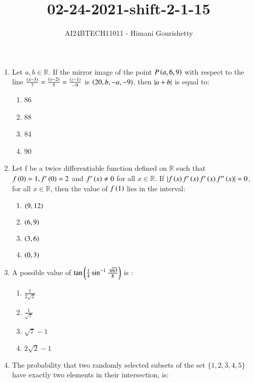\documentclass[journal,12pt,onecolumn]{IEEEtran}
\theoremstyle{remark}
\begin{document}

\vspace{3cm}

\title{02-24-2021-shift-2-1-15}
\author{AI24BTECH11011 - Himani Gourishetty}
\maketitle
\bigskip

\renewcommand{\thefigure}{\theenumi}
\renewcommand{\thetable}{\theenumi}
\begin{enumerate}
    \item Let $a,b \in \mathbb{R}$. If the mirror image of the point $P\left(a,6,9\right)$ with respect to the line $\frac{\left(x-3\right)}{7}=\frac{\left(y-2\right)}{5}=\frac{\left(z-1\right)}{-9}$ is $\left(20,b,-a,-9\right)$, then $\left\vert a+b\right\vert$ is equal to:
    \begin{enumerate}
        \item 86
        \item 88
        \item 84
        \item 90
    \end{enumerate}
    \item Let f be a twice differentiable function defined on $\mathbb{R}$ such that $f\left(0\right)=1,f^{\prime}\left(0\right)=2$ and $f^{\prime}\left(x\right)\neq0$ for all $x \in\mathbb{R}$. If $\left\vert f\left(x\right)f^{\prime}\left(x\right)f^{\prime}\left(x\right)f''\left(x\right)\right\vert=0$, for all $x \in \mathbb{R}$, then the value of $f\left(1\right)$ lies in the interval:
    \begin{enumerate}
        \item $\left(9,12\right)$
        \item $\left(6,9\right)$
        \item $\left(3,6\right)$
        \item $\left(0,3\right)$
    \end{enumerate}
    \item A possible value of $\tan\left(\frac{1}{4}\sin^{-1}\frac{\sqrt{63}}{8}\right)$ is :
    \begin{enumerate}
        \item $\frac{1}{2\sqrt{2}}$
        \item $\frac{1}{\sqrt{7}}$
        \item $\sqrt{7}-1$
        \item $2\sqrt{2}-1$
    \end{enumerate}
    \item The probability that two randomly selected subsets of the set $\{1,2,3,4,5\}$ have exactly two elements in their intersection, is:

\end{enumerate}
\end{document}
